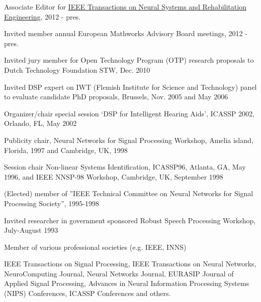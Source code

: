 \begin{items}
\item Associate Editor for \href{http://tnsre.bme.columbia.edu}{IEEE Transactions on Neural Systems and Rehabilitation Engineering}, 2012 - pres.
\item Invited member annual European Mathworks Advisory Board meetings, 2012 - pres.
\item Invited jury member for Open Technology Program (OTP) research proposals to Dutch Technology Foundation STW, Dec. 2010
\item Invited DSP expert on IWT (Flemish Institute for Science and Technology) panel to evaluate candidate PhD proposals, Brussels, Nov. 2005 and May 2006
\item Organizer/chair special session `DSP for Intelligent Hearing Aids', ICASSP 2002,
Orlando, FL, May 2002
\item Publicity chair, Neural Networks for Signal Processing Workshop,
Amelia island, Florida, 1997 and Cambridge, UK, 1998
\item Session chair Non-linear Systems Identification, ICASSP96,
Atlanta, GA, May 1996, and IEEE NNSP-98 Workshop, Cambridge, UK,
September 1998
\item (Elected) member of ''IEEE Technical Committee on Neural Networks for Signal Processing Society'', 1995-1998
\item Invited researcher in government sponsored Robust Speech Processing Workshop, July-August 1993
\item Member of various professional societies (e.g. IEEE, INNS)
\end{items}



IEEE Transactions on Signal Processing, IEEE Transactions on
Neural Networks, NeuroComputing Journal, Neural Networks Journal,
EURASIP Journal of Applied Signal Processing, Advances in Neural
Information Processing Systems (NIPS) Conferences, ICASSP
Conferences and others.